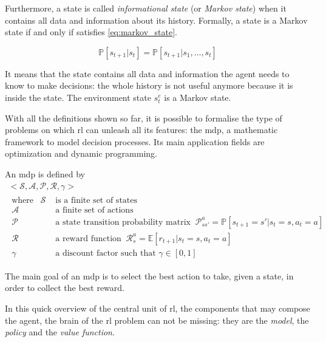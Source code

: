 Furthermore, a state is called \textit{informational state} (or \textit{Markov state}) when it contains all data and information about its history. Formally, a state is a Markov state if and only if satisfies \vref{eq:markov_state}.

\begin{equation} \label{eq:markov_state}
	\mathbb{P}[s_{t+1}| s_t] = \mathbb{P}[s_{t+1} | s_1, \dots, s_t]
\end{equation}

 It means that the state contains all data and information the agent needs to know to make decisions: the whole history is not useful anymore because it is inside the state. The environment state $s_t^e$ is a Markov state.
 
 With all the definitions shown so far, it is possible to formalise the type of problems on which \acrshort{rl} can unleash all its features: the \acrfull{mdp}, a mathematic framework to model decision processes. Its main application fields are optimization and dynamic programming.
 
 An \acrshort{mdp} is defined by 
 \begin{equation}\label{eq:mdp}
 \begin{gathered} 
 <\mathcal{S}, \mathcal{A}, \mathcal{P}, \mathcal{R}, \gamma>\\
 \begin{aligned}
 	\text{where}\hspace{10pt} \mathcal{S} & \text{ is a finite set of states} \\
 	\mathcal{A} & \text{ a finite set of actions} \\
 	\mathcal{P} & \text{ a state transition probability matrix}\;\;
 	 \mathcal{P}_{ss'}^a = \mathbb{P}[s_{t+1}= s' | s_t = s, a_t = a]\\
 	\mathcal{R} & \text{ a reward function}
 	 	\;\; \mathcal{R}_{s}^a = \mathbb{E}[r_{t+1} | s_t = s, a_t = a] \\
 	 \gamma & \text{ a discount factor such that } \gamma \in [0,1]
 \end{aligned}
 \end{gathered}
 \end{equation}


The main goal of an \acrshort{mdp} is to select the best action to take, given a state, in order to collect the best reward. 

In this quick overview of the central unit of \acrshort{rl}, the components that may compose the agent, the brain of the \acrshort{rl} problem can not be missing: they are the \textit{model}, the \textit{policy} and the \textit{value function}.

